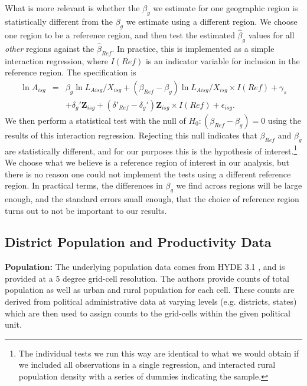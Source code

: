 \documentclass[11pt]{article}
\begin{document}
What is more relevant is whether the $\beta_g$ we estimate for one geographic region is statistically different from the $\beta_g$ we estimate using a different region. We choose one region to be a reference region, and then test the estimated $\hat{\beta}_g$ values for all \textit{other} regions against the $\hat{\beta}_{Ref}$. In practice, this is implemented as a simple interaction regression, where $I(Ref)$ is an indicator variable for inclusion in the reference region. The specification is
\begin{eqnarray}
    \ln A_{isg} &=& \beta_g \ln L_{Aisg}/X_{isg} + (\beta_{Ref} - \beta_g) \ln L_{Aisg}/X_{isg} \times I(Ref) + \gamma_{s} \\ \nonumber
     && + \delta_g' \mathbf{Z}_{isg} + (\delta'_{Ref} - \delta_g') \mathbf{Z}_{isg} \times I(Ref) + \epsilon_{isg}. \label{EQ_interaction}
\end{eqnarray}
We then perform a statistical test with the null of $H_0: (\beta_{Ref} - \beta_g) = 0$ using the results of this interaction regression. Rejecting this null indicates that $\beta_{Ref}$ and $\beta_g$ are statistically different, and for our purposes this is the hypothesis of interest.\footnote{The individual tests we run this way are identical to what we would obtain if we included all observations in a single regression, and interacted rural population density with a series of dummies indicating the sample.} We choose what we believe is a reference region of interest in our analysis, but there is no reason one could not implement the tests using a different reference region. In practical terms, the differences in $\beta_g$ we find across regions will be large enough, and the standard errors small enough, that the choice of reference region turns out to not be important to our results. 

\subsection{District Population and Productivity Data}

\noindent\textbf{Population:} The underlying population data comes from HYDE 3.1 \citep{hyde31}, and is provided at a 5 degree grid-cell resolution. The authors provide counts of total population as well as urban and rural population for each cell. These counts are derived from political administrative data at varying levels (e.g. districts, states) which are then used to assign counts to the grid-cells within the given political unit. 
\end{document}
